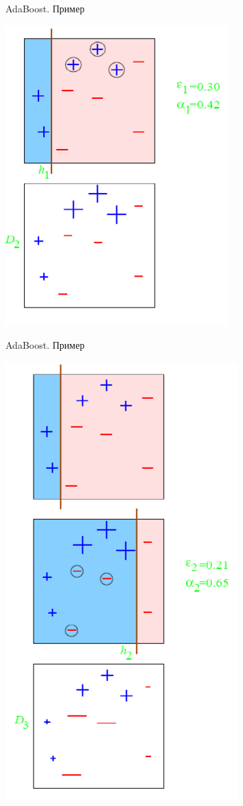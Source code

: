 \documentclass[10pt]{beamer}
\begin{document}
\begin{frame}{AdaBoost. Пример}
    \begin{center}
        \includegraphics[scale=0.3]{images/adaboost.png}
    \end{center}
\end{frame}

\begin{frame}{AdaBoost. Пример}
    \begin{center}
        \includegraphics[scale=0.3]{images/adaboost2.png}
    \end{center}
\end{frame}
\end{document}
